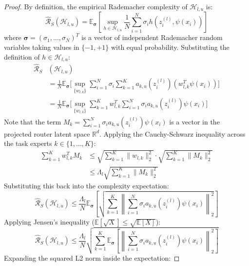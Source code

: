 \begin{proof}
By definition, the empirical Rademacher complexity of $\mathcal{H}_{l, u}$ is:
\begin{equation}
    \hat{\mathcal{R}}_S(\mathcal{H}_{l, u}) = \mathbb{E}_{\boldsymbol{\sigma}} \left[ \sup_{h \in \mathcal{H}_{l, u}} \frac{1}{N} \sum_{i=1}^N \sigma_i h(z_i^{(l)}, \psi(x_i)) \right]
\end{equation}
where $\boldsymbol{\sigma} = (\sigma_1, \dots, \sigma_N)^T$ is a vector of independent Rademacher random variables taking values in $\{-1, +1\}$ with equal probability. Substituting the definition of $h \in \mathcal{H}_{l, u}$:
\begin{align}
    \hat{\mathcal{R}}_S&(\mathcal{H}_{l, u}) \nonumber \\
    &= \frac{1}{N} \mathbb{E}_{\boldsymbol{\sigma}} \bigg[ \sup_{\{w_{l,k}\}} \sum_{i=1}^N \sigma_i \sum_{k=1}^K a_{k, u}(z_i^{(l)}) \left( w_{l, k}^T \psi(x_i) \right) \bigg] \nonumber \\
    &= \frac{1}{N} \mathbb{E}_{\boldsymbol{\sigma}} \bigg[ \sup_{\{w_{l,k}\}} \sum_{k=1}^K w_{l, k}^T \sum_{i=1}^N \sigma_i a_{k, u}(z_i^{(l)}) \psi(x_i) \bigg]
\end{align}
Note that the term $M_k = \sum_{i=1}^N \sigma_i a_{k, u}(z_i^{(l)}) \psi(x_i)$ is a vector in the projected router latent space $\mathbb{R}^d$. Applying the Cauchy-Schwarz inequality across the task experts $k \in \{1,\dots,K\}$:
\begin{align}
    \sum_{k=1}^K w_{l, k}^T M_k &\leq \sqrt{\sum_{k=1}^K \|w_{l, k}\|_2^2} \cdot \sqrt{\sum_{k=1}^K \|M_k\|_2^2} \nonumber \\
    &\leq \Lambda_l \sqrt{\sum_{k=1}^K \|M_k\|_2^2}
\end{align}
Substituting this back into the complexity expectation:
\begin{equation}
    \hat{\mathcal{R}}_S(\mathcal{H}_{l, u}) \leq \frac{\Lambda_l}{N} \mathbb{E}_{\boldsymbol{\sigma}} \left[ \sqrt{ \sum_{k=1}^K \left\| \sum_{i=1}^N \sigma_i a_{k, u}(z_i^{(l)}) \psi(x_i) \right\|_2^2 } \right]
\end{equation}
Applying Jensen's inequality ($\mathbb{E}[\sqrt{X}] \leq \sqrt{\mathbb{E}[X]}$):
\begin{equation}
    \hat{\mathcal{R}}_S(\mathcal{H}_{l, u}) \leq \frac{\Lambda_l}{N} \sqrt{ \sum_{k=1}^K \mathbb{E}_{\boldsymbol{\sigma}} \left[ \left\| \sum_{i=1}^N \sigma_i a_{k, u}(z_i^{(l)}) \psi(x_i) \right\|_2^2 \right] }
\end{equation}
Expanding the squared L2 norm inside the expectation:

\end{proof}
